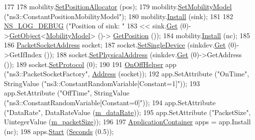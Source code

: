 \begin{DoxyCode}
177 
178     mobility.\hyperlink{classns3_1_1MobilityHelper_ac59d5295076be3cc11021566713a28c5}{SetPositionAllocator} (pos);
179     mobility.\hyperlink{classns3_1_1MobilityHelper_a030275011b6f40682e70534d30280aba}{SetMobilityModel} (\textcolor{stringliteral}{"ns3::ConstantPositionMobilityModel"});
180     mobility.\hyperlink{classns3_1_1MobilityHelper_a07737960ee95c0777109cf2994dd97ae}{Install} (sink);
181 
182     \hyperlink{group__logging_ga413f1886406d49f59a6a0a89b77b4d0a}{NS\_LOG\_DEBUG} (\textcolor{stringliteral}{"Position of sink: "}
183                   << sink.\hyperlink{classns3_1_1NodeContainer_a9ed96e2ecc22e0f5a3d4842eb9bf90bf}{Get} (0)->\hyperlink{classns3_1_1Object_a13e18c00017096c8381eb651d5bd0783}{GetObject}<\hyperlink{classns3_1_1MobilityModel}{MobilityModel}> ()->
      \hyperlink{lena-cqi-threshold_8cc_acebf763e1a0478cec225f9547941ae54}{GetPosition} ());
184     mobility.\hyperlink{classns3_1_1MobilityHelper_a07737960ee95c0777109cf2994dd97ae}{Install} (nc);
185 
186     \hyperlink{classns3_1_1PacketSocketAddress}{PacketSocketAddress} socket;
187     socket.\hyperlink{classns3_1_1PacketSocketAddress_ad1caa016f4d27c9d5f2c06dbfc53f8a3}{SetSingleDevice} (sinkdev.\hyperlink{classns3_1_1NetDeviceContainer_a677d62594b5c9d2dea155cc5045f4d0b}{Get} (0)->GetIfIndex ());
188     socket.\hyperlink{classns3_1_1PacketSocketAddress_a9452f9410a97e57344e464e25c2ab0f3}{SetPhysicalAddress} (sinkdev.\hyperlink{classns3_1_1NetDeviceContainer_a677d62594b5c9d2dea155cc5045f4d0b}{Get} (0)->GetAddress ());
189     socket.\hyperlink{classns3_1_1PacketSocketAddress_a9020962e39c238277f3b2f0de605647a}{SetProtocol} (0);
190 
191     \hyperlink{classns3_1_1OnOffHelper}{OnOffHelper} app (\textcolor{stringliteral}{"ns3::PacketSocketFactory"}, \hyperlink{classns3_1_1Address}{Address} (socket));
192     app.SetAttribute (\textcolor{stringliteral}{"OnTime"}, StringValue (\textcolor{stringliteral}{"ns3::ConstantRandomVariable[Constant=1]"}));
193     app.SetAttribute (\textcolor{stringliteral}{"OffTime"}, StringValue (\textcolor{stringliteral}{"ns3::ConstantRandomVariable[Constant=0]"}));
194     app.SetAttribute (\textcolor{stringliteral}{"DataRate"}, DataRateValue (\hyperlink{classExperiment_a5b781fcc8b0242604e4378c1df035228}{m\_dataRate}));
195     app.SetAttribute (\textcolor{stringliteral}{"PacketSize"}, UintegerValue (\hyperlink{classExperiment_a1562acfc7bc2cbd4c5f995b7c4ef01d0}{m\_packetSize}));
196 
197     \hyperlink{classns3_1_1ApplicationContainer}{ApplicationContainer} apps = app.Install (nc);
198     apps.\hyperlink{classns3_1_1ApplicationContainer_a8eff87926507020bbe3e1390358a54a7}{Start} (\hyperlink{group__timecivil_ga33c34b816f8ff6628e33d5c8e9713b9e}{Seconds} (0.5));

\end{DoxyCode}
